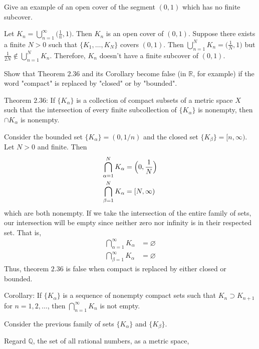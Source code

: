 \begin{exercise}
\item
  Give an example of an open cover of the segment \((0,1)\) which has no
  finite subcover.
  \par\smallskip
  Let \(K_n = \bigcup_{n = 1}^{\infty}\bigl(\frac{1}{n},1\bigr)\).
  Then \(K_n\) is an open cover of \((0,1)\).
  Suppose there exists a finite \(N > 0\) such that \(\{K_1,\ldots,K_N\}\)
  covers \((0,1)\).
  Then \(\bigcup_{n = 1}^NK_n = \bigl(\frac{1}{N},1\bigr)\) but
  \(\frac{1}{2N}\notin\bigcup_{n = 1}^NK_n\).
  Therefore, \(K_n\) doesn't have a finite subcover of \((0,1)\).
\item
  Show that Theorem \(2.36\) and its Corollary become false (in \(\mathbb{R}\),
  for example) if the word "compact" is replaced by "closed" or by "bounded".
  \par\smallskip
  Theorem \(2.36\): If \(\{K_{\alpha}\}\) is a collection of compact subsets of
  a metric space \(X\) such that the intersection of every finite subcollection
  of \(\{K_{\alpha}\}\) is nonempty, then \(\cap K_{\alpha}\) is nonempty.
  \par\smallskip
  Consider the bounded set \(\{K_{\alpha}\} = (0,1/n)\) and the closed set
  \(\{K_{\beta}\} = [n,\infty)\).
  Let \(N > 0\) and finite.
  Then
  \begin{align*}
    \bigcap_{\alpha = 1}^NK_{\alpha} & = \Bigl(0, \frac{1}{N}\Bigr)\\
    \bigcap_{\beta = 1}^NK_{\alpha} & = [N, \infty)
  \end{align*}
  which are both nonempty.
  If we take the intersection of the entire family of sets, our intersection
  will be empty since neither zero nor infinity is in their respected set.
  That is,
  \begin{align*}
    \bigcap_{\alpha = 1}^{\infty}K_{\alpha} & = \varnothing\\
    \bigcap_{\beta = 1}^{\infty}K_{\alpha} & = \varnothing
  \end{align*}
  Thus, theorem \(2.36\) is false when compact is replaced by either closed or
  bounded.
  \par\smallskip
  Corollary: If \(\{K_{\alpha}\}\) is a sequence of nonempty compact sets such
  that \(K_n\supset K_{n + 1}\) for \(n=1,2,\ldots\), then
  \(\bigcap_{n = 1}^{\infty}K_n\) is not empty.
  \par\smallskip
  Consider the previous family of sets \(\{K_{\alpha}\}\) and
  \(\{K_{\beta}\}\).
\item
  Regard \(\mathbb{Q}\), the set of all rational numbers, as a metric space,

\end{exercise}
